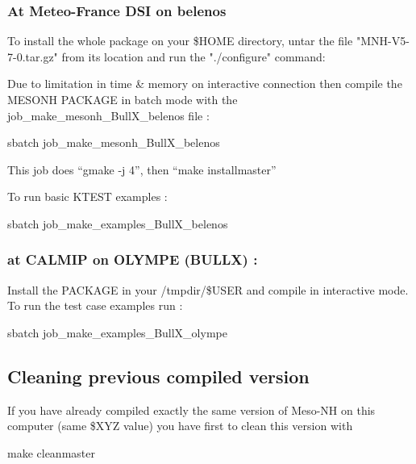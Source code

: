 \subsubsection{At Meteo-France DSI on belenos}

To install the whole package on your \$HOME directory, untar the file "MNH-V5-7-0.tar.gz" from its location and run the "./configure" command:

Due to limitation in time & memory on interactive connection then compile the MESONH PACKAGE in batch mode with the job\_make\_mesonh\_BullX\_belenos file :
\begin{bashcode}
sbatch job_make_mesonh_BullX_belenos
\end{bashcode}

This job does ``gmake -j 4'', then ``make installmaster''

To run basic KTEST examples :
\begin{bashcode}
sbatch job_make_examples_BullX_belenos
\end{bashcode}
 
\subsubsection{at CALMIP on OLYMPE (BULLX)  :}

Install the PACKAGE in your /tmpdir/\$USER and compile in interactive mode. \\

To run the test case examples  run :
\begin{bashcode}
sbatch job_make_examples_BullX_olympe
\end{bashcode}

\subsection{Cleaning previous compiled version}

If you have already compiled exactly the same version of Meso-NH on this computer (same \$XYZ value) you have first to clean this version with
\begin{bashcode}
make cleanmaster
\end{bashcode}

